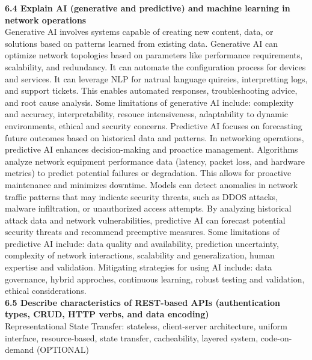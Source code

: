 \documentclass{article}
\begin{document}
\textbf{6.4 Explain AI (generative and predictive) and machine learning in network operations}\\
	
	Generative AI involves systems capable of creating new content, data, or solutions based on patterns learned from existing data. Generative AI can optimize network topologies based on parameters like performance requirements, scalability, and redundancy. It can automate the configuration process for devices and services. It can leverage NLP for natrual language quireies, interpretting logs, and support tickets. This enables automated responses, troubleshooting advice, and root cause analysis. Some limitations of generative AI include: complexity and accuracy, interpretability, resouce intensiveness, adaptability to dynamic environments, ethical and security concerns. Predictive AI focuses on forecasting future outcomes based on historical data and patterns. In networking operations, predictive AI enhances decision-making and proactice management. Algorithms analyze network equipment performance data (latency, packet loss, and hardware metrics) to predict potential failures or degradation. This allows for proactive maintenance and minimizes downtime. Models can detect anomalies in network traffic patterns that may indicate security threats, such as DDOS attacks, malware infiltration, or unauthorized access attempts. By analyzing historical attack data and network vulnerabilities, predictive AI can forecast potential security threats and recommend preemptive measures. Some limitations of predictive AI include: data quality and availability, prediction uncertainty, complexity of network interactions, scalability and generalization, human expertise and validation. Mitigating strategies for using AI include: data governance, hybrid approches, continuous learning, robust testing and validation, ethical considerations.\\
	
\textbf{6.5 Describe characteristics of REST-based APIs (authentication types, CRUD, HTTP verbs, and data encoding)}\\

Representational State Transfer: stateless, client-server architecture, uniform interface, resource-based, state transfer, cacheability, layered system, code-on-demand (OPTIONAL)\\
\end{document}
